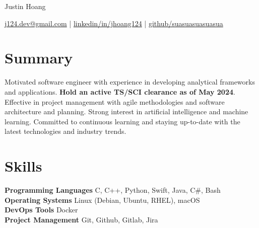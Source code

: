\documentclass[11pt]{article}       %
\begin{document}
\centerline{\Huge Justin Hoang}

\vspace{5pt}

\centerline{\href{mailto:j124.dev@gmail.com}{j124.dev@gmail.com}
  | \href{https://www.linkedin.com/in/jhoang124/}{linkedin/in/jhoang124}
  | \href{https://github.com/suasuasuasuasua}{github/suasuasuasuasua}}

\vspace{-10pt}

\section*{Summary}
Motivated software engineer with experience in developing analytical frameworks
and applications. \textbf{Hold an active TS/SCI clearance as of May 2024}.
Effective in project management with agile methodologies and software
architecture and planning. Strong interest in artificial intelligence and
machine learning. Committed to continuous learning and staying up-to-date with
the latest technologies and industry trends.
\vspace{-6.5pt}

\section*{Skills}
\textbf{Programming Languages} C, C++, Python, Swift, Java, C\#, Bash \\
\textbf{Operating Systems} Linux (Debian, Ubuntu, RHEL), macOS \\
\textbf{DevOps Tools} Docker \\
\textbf{Project Management} Git, Github, Gitlab, Jira \\

\vspace{-6.5pt}
\end{document}
